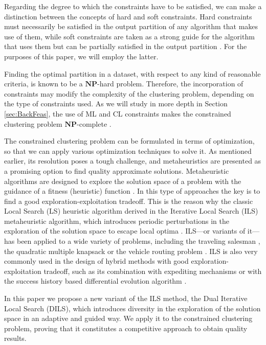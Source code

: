 \documentclass[review]{elsarticle}
\begin{document}
Regarding the degree to which the constraints have to be satisfied, we can make a distinction between the concepts of hard \cite{wagstaff2001constrained} and soft \cite{law2004clustering} constraints. Hard constraints must necessarily be satisfied in the output partition of any algorithm that makes use of them, while soft constraints are taken as a strong guide for the algorithm that uses them but can be partially satisfied in the output partition \cite{seret2014new}. For the purposes of this paper, we will employ the latter.

Finding the optimal partition in a dataset, with respect to any kind of reasonable criteria, is known to be a $\mathbf{NP}$-hard problem. Therefore, the incorporation of constraints may modify the complexity of the clustering problem, depending on the type of constraints used. As we will study in more depth in Section \ref{sec:BackFeas}, the use of ML and CL constraints makes the constrained clustering problem $\mathbf{NP}$-complete \cite{davidson2005clustering}.

The constrained clustering problem can be formulated in terms of optimization, so that we can apply various optimization techniques to solve it. As mentioned earlier, its resolution poses a tough challenge, and metaheuristics are presented as a promising option to find quality approximate solutions. Metaheuristic algorithms are designed to explore the solution space of a problem with the guidance of a fitness (heuristic) function \cite{Gendreau:2010:HM:1941310}. In this type of approaches the key is to find a good exploration-exploitation tradeoff. This is the reason why the classic Local Search (LS) heuristic algorithm derived in the Iterative Local Search (ILS) metaheuristic algorithm, which introduces periodic perturbations in the exploration of the solution space to escape local optima \cite{lourencco2010iterated}. ILS---or variants of it---has been applied to a wide variety of problems, including the traveling salesman \cite{archetti2018iterated}, the quadratic multiple knapsack \cite{avci2017multi} or the vehicle routing problem \cite{chentli2018impact, estrada2019biased}. ILS is also very commonly used in the design of hybrid methods with good exploration-exploitation tradeoff, such as its combination with expediting mechanisms \cite{zohali2019reformulation} or with the success history based differential evolution algorithm \cite{zhao2019hybrid}.

In this paper we propose a new variant of the ILS method, the Dual Iterative Local Search (DILS), which introduces diversity in the exploration of the solution space in an adaptive and guided way. We apply it to the constrained clustering problem, proving that it constitutes a competitive approach to obtain quality results.
\end{document}
